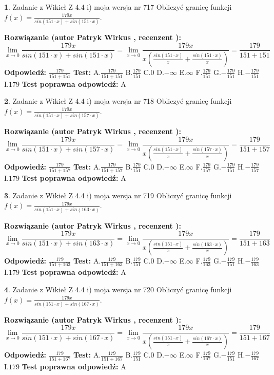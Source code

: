 \documentclass[12pt, a4paper]{article}
\theoremstyle{definition} %
\newtheorem{zad}{}
\newcommand{\zadStart}[1]{\begin{zad}#1\newline}
\newcommand{\zadStop}{\end{zad}}
\newcommand{\rozwStart}[2]{\noindent \textbf{Rozwiązanie (autor #1 , recenzent #2): }\newline}
\newcommand{\rozwStop}{\newline}
\newcommand{\odpStart}{\noindent \textbf{Odpowiedź:}\newline}
\newcommand{\odpStop}{\newline}
\newcommand{\testStart}{\noindent \textbf{Test:}\newline}
\newcommand{\testStop}{\newline}
\newcommand{\kluczStart}{\noindent \textbf{Test poprawna odpowiedź:}\newline}
\newcommand{\kluczStop}{\newline}
\begin{document}
\zadStart{Zadanie z Wikieł Z 4.4 i) moja wersja nr 717}
Obliczyć granicę funkcji $f(x)=\frac{179x}{sin(151\cdot x) +sin(151\cdot x)}$.
\zadStop
\rozwStart{Patryk Wirkus}{}
$$\lim\limits_{x\to 0}\frac{179x}{sin(151\cdot x) +sin(151\cdot x)}=\lim\limits_{x\to 0}\frac{179x}{x(\frac{sin(151\cdot x)}{x}+\frac{sin(151\cdot x)}{x})}=\frac{179}{151+151}$$
\rozwStop
\odpStart
$\frac{179}{151+151}$
\odpStop
\testStart
A.$\frac{179}{151+151}$
B.$\frac{179}{151}$
C.$0$
D.$-\infty$
E.$\infty$
F.$\frac{179}{151}$
G.$-\frac{179}{151}$
H.$-\frac{179}{151}$
I.$179$
\testStop
\kluczStart
A
\kluczStop



\zadStart{Zadanie z Wikieł Z 4.4 i) moja wersja nr 718}
Obliczyć granicę funkcji $f(x)=\frac{179x}{sin(151\cdot x) +sin(157\cdot x)}$.
\zadStop
\rozwStart{Patryk Wirkus}{}
$$\lim\limits_{x\to 0}\frac{179x}{sin(151\cdot x) +sin(157\cdot x)}=\lim\limits_{x\to 0}\frac{179x}{x(\frac{sin(151\cdot x)}{x}+\frac{sin(157\cdot x)}{x})}=\frac{179}{151+157}$$
\rozwStop
\odpStart
$\frac{179}{151+157}$
\odpStop
\testStart
A.$\frac{179}{151+157}$
B.$\frac{179}{151}$
C.$0$
D.$-\infty$
E.$\infty$
F.$\frac{179}{157}$
G.$-\frac{179}{151}$
H.$-\frac{179}{157}$
I.$179$
\testStop
\kluczStart
A
\kluczStop



\zadStart{Zadanie z Wikieł Z 4.4 i) moja wersja nr 719}
Obliczyć granicę funkcji $f(x)=\frac{179x}{sin(151\cdot x) +sin(163\cdot x)}$.
\zadStop
\rozwStart{Patryk Wirkus}{}
$$\lim\limits_{x\to 0}\frac{179x}{sin(151\cdot x) +sin(163\cdot x)}=\lim\limits_{x\to 0}\frac{179x}{x(\frac{sin(151\cdot x)}{x}+\frac{sin(163\cdot x)}{x})}=\frac{179}{151+163}$$
\rozwStop
\odpStart
$\frac{179}{151+163}$
\odpStop
\testStart
A.$\frac{179}{151+163}$
B.$\frac{179}{151}$
C.$0$
D.$-\infty$
E.$\infty$
F.$\frac{179}{163}$
G.$-\frac{179}{151}$
H.$-\frac{179}{163}$
I.$179$
\testStop
\kluczStart
A
\kluczStop



\zadStart{Zadanie z Wikieł Z 4.4 i) moja wersja nr 720}
Obliczyć granicę funkcji $f(x)=\frac{179x}{sin(151\cdot x) +sin(167\cdot x)}$.
\zadStop
\rozwStart{Patryk Wirkus}{}
$$\lim\limits_{x\to 0}\frac{179x}{sin(151\cdot x) +sin(167\cdot x)}=\lim\limits_{x\to 0}\frac{179x}{x(\frac{sin(151\cdot x)}{x}+\frac{sin(167\cdot x)}{x})}=\frac{179}{151+167}$$
\rozwStop
\odpStart
$\frac{179}{151+167}$
\odpStop
\testStart
A.$\frac{179}{151+167}$
B.$\frac{179}{151}$
C.$0$
D.$-\infty$
E.$\infty$
F.$\frac{179}{167}$
G.$-\frac{179}{151}$
H.$-\frac{179}{167}$
I.$179$
\testStop
\kluczStart
A
\kluczStop
\end{document}

